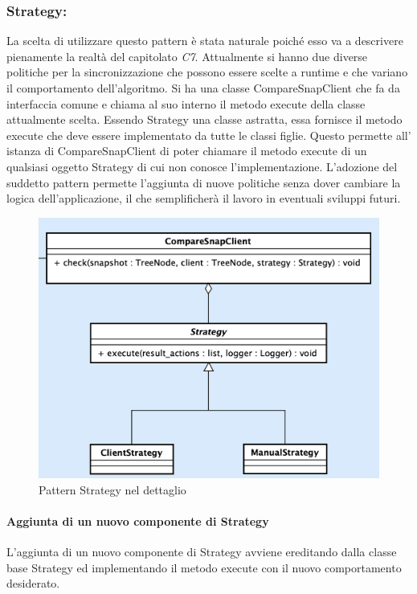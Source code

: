 \subsubsection{Strategy:}
La scelta di utilizzare questo pattern è stata naturale poiché esso va a descrivere pienamente la realtà del capitolato \textit{C7}.\newline{}
Attualmente si hanno due diverse politiche per la sincronizzazione che possono essere scelte a runtime e che variano il comportamento dell'algoritmo. Si ha una classe CompareSnapClient che fa da interfaccia comune e chiama al suo interno il metodo execute della classe attualmente scelta. Essendo Strategy una classe astratta, essa fornisce il metodo execute che deve essere implementato da tutte le classi figlie. Questo permette all' istanza di CompareSnapClient di poter chiamare il metodo execute di un qualsiasi oggetto Strategy di cui non conosce l'implementazione. L'adozione del suddetto pattern permette l'aggiunta di nuove politiche senza dover cambiare la logica dell'applicazione, il che semplificherà il lavoro in eventuali sviluppi futuri.
\begin{figure}[H]
    \centering
    \includegraphics[scale = 0.38]{components/img/strategy-model.png}
    \caption{Pattern Strategy nel dettaglio}
    \label{fig:Pattern Strategy nel dettaglio}
\end{figure}
\paragraph{Aggiunta di un nuovo componente di Strategy}
L'aggiunta di un nuovo componente di Strategy avviene ereditando dalla classe base Strategy ed implementando il metodo execute con il nuovo comportamento desiderato.
